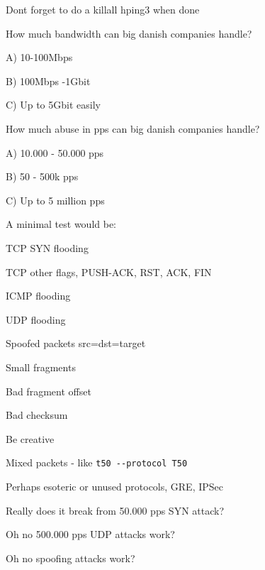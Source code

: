 \documentclass[20pt,landscape,a4paper,footrule]{foils}
\begin{document}
\vskip 1cm
\centerline{Dont forget to do a killall hping3 when done \smiley }


How much bandwidth can big danish companies handle?
\begin{list2}
\item A) 10-100Mbps
\item B) 100Mbps -1Gbit
\item C) Up to 5Gbit easily
\end{list2}

How much abuse in pps can big danish companies handle?
\begin{list2}
\item A) 10.000 - 50.000 pps
\item B) 50 - 500k pps
\item C) Up to 5 million pps
\end{list2}


A minimal test would be:
\begin{list2}
\item TCP SYN flooding
\item TCP other flags, PUSH-ACK, RST, ACK, FIN
\item ICMP flooding
\item UDP flooding
\item Spoofed packets src=dst=target \smiley
\item Small fragments
\item Bad fragment offset
\item Bad checksum
\item Be creative
\item Mixed packets - like \verb+t50 --protocol T50+
\item Perhaps esoteric or unused protocols, GRE, IPSec
\end{list2}




\centerline{Really does it break from 50.000 pps SYN attack?}



\centerline{Oh no 500.000 pps UDP attacks work?}


\centerline{Oh no spoofing attacks work?}
\end{document}
